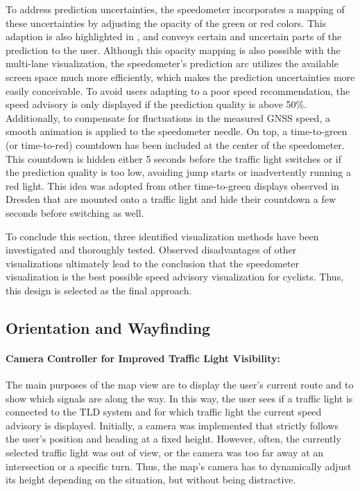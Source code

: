 To address prediction uncertainties, the speedometer incorporates a mapping of these uncertainties by adjusting the opacity of the green or red colors. This adaption is also highlighted in , and conveys certain and uncertain parts of the prediction to the user. Although this opacity mapping is also possible with the multi-lane visualization, the speedometer's prediction arc utilizes the available screen space much more efficiently, which makes the prediction uncertainties more easily conceivable. To avoid users adapting to a poor speed recommendation, the speed advisory is only displayed if the prediction quality is above 50\%. Additionally, to compensate for fluctuations in the measured GNSS speed, a smooth animation is applied to the speedometer needle. On top, a time-to-green (or time-to-red) countdown has been included at the center of the speedometer. This countdown is hidden either 5 seconds before the traffic light switches or if the prediction quality is too low, avoiding jump starts or inadvertently running a red light. This idea was adopted from other time-to-green displays observed in Dresden that are mounted onto a traffic light and hide their countdown a few seconds before switching as well.

To conclude this section, three identified visualization methods have been investigated and thoroughly tested. Observed disadvantages of other visualizations ultimately lead to the conclusion that the speedometer visualization is the best possible speed advisory visualization for cyclists. Thus, this design is selected as the final approach.

\subsection{Orientation and Wayfinding}

\paragraph{Camera Controller for Improved Traffic Light Visibility:} The main purposes of the map view are to display the user's current route and to show which signals are along the way. In this way, the user sees if a traffic light is connected to the TLD system and for which traffic light the current speed advisory is displayed. Initially, a camera was implemented that strictly follows the user's position and heading at a fixed height. However, often, the currently selected traffic light was out of view, or the camera was too far away at an intersection or a specific turn. Thus, the map's camera has to dynamically adjust its height depending on the situation, but without being distractive.

